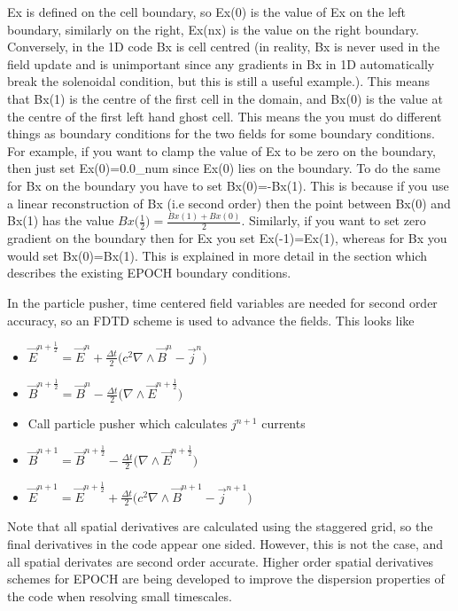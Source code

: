 \documentclass[12pt]{article}
\newcommand{\EPOCH}{{\color{warwickdark}\fontfamily{phv}\selectfont EPOCH} }
\begin{document}
Ex is defined on the cell boundary, so Ex(0) is the value of Ex on the left
boundary, similarly on the right, Ex(nx) is the value on the right
boundary. Conversely, in the 1D code Bx is cell centred (in reality, Bx is
never used in the field update and is unimportant since any gradients in Bx in
1D automatically break the solenoidal condition, but this is still a useful
example.). This means that Bx(1) is the centre of the first cell in the domain,
and Bx(0) is the value at the centre of the first left hand ghost cell. This
means the you must do different things as boundary conditions for the two
fields for some boundary conditions.\\

For example, if you want to clamp the value of Ex to be zero on the boundary,
then just set Ex(0)=0.0\_num since Ex(0) lies on the boundary. To do the same
for Bx on the boundary you have to set Bx(0)=-Bx(1). This is because if you use
a linear reconstruction of Bx (i.e second order) then the point between Bx(0)
and Bx(1) has the value $Bx\bigl( \frac{1}{2} \bigr) =
\frac{Bx(1)+Bx(0)}{2}$. Similarly, if you want to set zero gradient on the
boundary then for Ex you set Ex(-1)=Ex(1), whereas for Bx you would set
Bx(0)=Bx(1). This is explained in more detail in the section which describes
the existing \EPOCH boundary conditions.

In the particle pusher, time centered field variables are needed for second
order accuracy, so an FDTD scheme is used to advance the fields. This looks
like

\begin{itemize}
\item $\vec{E}^{n+\frac{1}{2}} = \vec{E}^n + \frac{\Delta t}{2} \bigl( c^2
  \nabla \wedge \vec{B}^{n} -\vec{j}^{n} \bigr)$
\item $\vec{B}^{n+\frac{1}{2}} = \vec{B}^n - \frac{\Delta t}{2} \bigl( \nabla
  \wedge \vec{E}^{n+\frac{1}{2}} \bigr)$
\item Call particle pusher which calculates $j^{n+1}$ currents
\item $\vec{B}^{n+1} = \vec{B}^{n+\frac{1}{2}} - \frac{\Delta t}{2} \bigl(
  \nabla \wedge \vec{E}^{n+\frac{1}{2}} \bigr)$
\item $\vec{E}^{n+1} = \vec{E}^{n+\frac{1}{2}} + \frac{\Delta t}{2} \bigl( c^2
  \nabla \wedge \vec{B} ^{n+1} - \vec{j}^{n+1} \bigr)$
\end{itemize}
Note that all spatial derivatives are calculated using the staggered grid, so
the final derivatives in the code appear one sided. However, this is not the
case, and all spatial derivates are second order accurate. Higher order spatial
derivatives schemes for \EPOCH are being developed to improve the dispersion
properties of the code when resolving small timescales.
\end{document}
